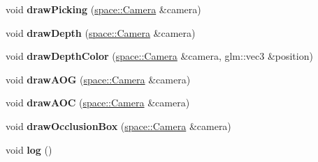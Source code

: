 \begin{DoxyCompactItemize}
\item 
\hypertarget{classfillwave_1_1models_1_1Mesh_a081e7ebcb911584a8fcd6cde9d9f953a}{}void {\bfseries draw\+Picking} (\hyperlink{classfillwave_1_1space_1_1Camera}{space\+::\+Camera} \&camera)\label{classfillwave_1_1models_1_1Mesh_a081e7ebcb911584a8fcd6cde9d9f953a}

\item 
\hypertarget{classfillwave_1_1models_1_1Mesh_a783a7c5c14d82530dab2c8687107f51a}{}void {\bfseries draw\+Depth} (\hyperlink{classfillwave_1_1space_1_1Camera}{space\+::\+Camera} \&camera)\label{classfillwave_1_1models_1_1Mesh_a783a7c5c14d82530dab2c8687107f51a}

\item 
\hypertarget{classfillwave_1_1models_1_1Mesh_a1d8095d0f217c0f48aabc58a50c9d5f2}{}void {\bfseries draw\+Depth\+Color} (\hyperlink{classfillwave_1_1space_1_1Camera}{space\+::\+Camera} \&camera, glm\+::vec3 \&position)\label{classfillwave_1_1models_1_1Mesh_a1d8095d0f217c0f48aabc58a50c9d5f2}

\item 
\hypertarget{classfillwave_1_1models_1_1Mesh_a76dc0c57d61b1d1dd63949080f32a908}{}void {\bfseries draw\+A\+O\+G} (\hyperlink{classfillwave_1_1space_1_1Camera}{space\+::\+Camera} \&camera)\label{classfillwave_1_1models_1_1Mesh_a76dc0c57d61b1d1dd63949080f32a908}

\item 
\hypertarget{classfillwave_1_1models_1_1Mesh_aa17056007b007018db121176a763c40e}{}void {\bfseries draw\+A\+O\+C} (\hyperlink{classfillwave_1_1space_1_1Camera}{space\+::\+Camera} \&camera)\label{classfillwave_1_1models_1_1Mesh_aa17056007b007018db121176a763c40e}

\item 
\hypertarget{classfillwave_1_1models_1_1Mesh_a8ff6fda81a630463470d3adb6d323c07}{}void {\bfseries draw\+Occlusion\+Box} (\hyperlink{classfillwave_1_1space_1_1Camera}{space\+::\+Camera} \&camera)\label{classfillwave_1_1models_1_1Mesh_a8ff6fda81a630463470d3adb6d323c07}

\item 
\hypertarget{classfillwave_1_1models_1_1Mesh_a84c1ebcaddba6386a8eb9e54bf6fd368}{}void {\bfseries log} ()\label{classfillwave_1_1models_1_1Mesh_a84c1ebcaddba6386a8eb9e54bf6fd368}

\end{DoxyCompactItemize}
